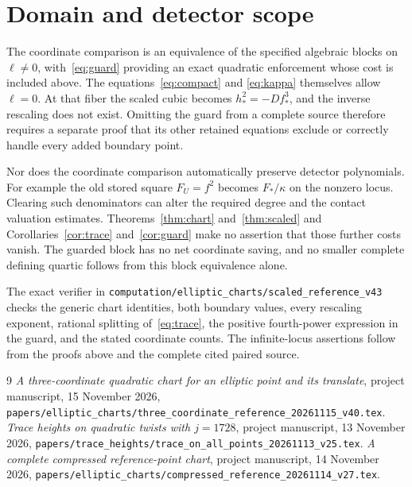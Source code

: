 \documentclass[11pt,a4paper]{article}
\theoremstyle{remark}\newtheorem{remark}[theorem]{Remark}
\begin{document}
\section{Domain and detector scope}
The coordinate comparison is an equivalence of the specified algebraic
blocks on $\ell\ne0$, with~\eqref{eq:guard} providing an exact
quadratic enforcement whose cost is included above.
The equations~\eqref{eq:compact} and
\eqref{eq:kappa} themselves allow $\ell=0$. At that fiber the
scaled cubic becomes $h_*^2=-Df_*^3$, and the inverse rescaling
does not exist. Omitting the guard from a complete source therefore
requires a separate proof that its other retained equations exclude
or correctly handle every added boundary point.

Nor does the coordinate comparison automatically preserve detector
polynomials. For example the old stored square $F_U=f^2$ becomes
$F_*/\kappa$ on the nonzero locus. Clearing such denominators can
alter the required degree and the contact valuation estimates.
Theorems~\ref{thm:chart} and~\ref{thm:scaled} and
Corollaries~\ref{cor:trace} and~\ref{cor:guard} make no assertion
that those further costs vanish. The guarded block has no net
coordinate saving, and no smaller complete defining quartic follows
from this block equivalence alone.

The exact verifier in
\nolinkurl{computation/elliptic_charts/scaled_reference_v43}
checks the generic chart identities, both boundary values, every
rescaling exponent, rational splitting of~\eqref{eq:trace}, the
positive fourth-power expression in the guard, and the stated
coordinate counts. The infinite-locus assertions follow
from the proofs above and the complete cited paired source.

\begin{thebibliography}{9}
\emph{A three-coordinate quadratic chart for an elliptic
point and its translate}, project manuscript, 15 November 2026,
\nolinkurl{papers/elliptic_charts/three_coordinate_reference_20261115_v40.tex}.
\emph{Trace heights on quadratic twists with $j=1728$},
project manuscript, 13 November 2026,
\nolinkurl{papers/trace_heights/trace_on_all_points_20261113_v25.tex}.
\emph{A complete compressed reference-point chart},
project manuscript, 14 November 2026,
\nolinkurl{papers/elliptic_charts/compressed_reference_20261114_v27.tex}.
\end{thebibliography}
\end{document}
